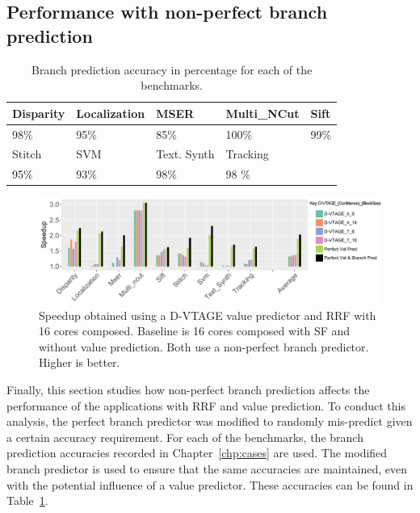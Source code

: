 \subsection{Performance with non-perfect branch prediction}

\begin{table}[t]
  \smaller
  \centering
 \begin{tabular} { | l | l | l | l | l | }
 \hline
   \cellcolor[gray]{0.7}Disparity & \cellcolor[gray]{0.7} Localization& \cellcolor[gray]{0.7} MSER& \cellcolor[gray]{0.7} Multi\_NCut& \cellcolor[gray]{0.7} Sift\\ \hline
	98\%  & 95\% & 85\%  & 100\%& 99\%\\ \hline
	 \cellcolor[gray]{0.7} Stitch & \cellcolor[gray]{0.7} SVM & \cellcolor[gray]{0.7} Text. Synth & \cellcolor[gray]{0.7} Tracking&\\ \hline
	  95\%& 93\%& 98\%& 98 \%&\\ \hline
	\end{tabular}
  \caption{Branch prediction accuracy in percentage for each of the benchmarks.}\label{tab:sd-vbsbpred2}
  \vspace{1em}
\end{table}
\begin{figure}[t]
    \centering
    \includegraphics[width=1\textwidth]{chapter3/graphics/with_bpred.pdf}

    \caption{Speedup obtained using a D-VTAGE value predictor and RRF with 16 cores composed. Baseline is 16 cores composed with SF and without value prediction. Both use a non-perfect branch predictor. Higher is better.}
	\vspace{1em}
    \label{fig:bpred}
\end{figure}
Finally, this section studies how non-perfect branch prediction affects the performance of the applications with RRF and value prediction.
To conduct this analysis, the perfect branch predictor was modified to randomly mis-predict given a certain accuracy requirement.
For each of the benchmarks, the branch prediction accuracies recorded in Chapter~\ref{chp:cases} are used.
The modified branch predictor is used to ensure that the same accuracies are maintained, even with the potential influence of a value predictor.
These accuracies can be found in Table~\ref{tab:sd-vbsbpred2}.

